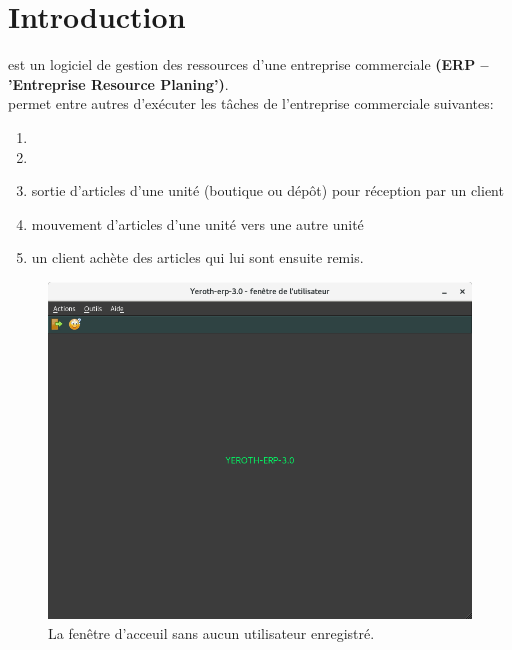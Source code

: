 \chapter{Introduction}\label{chap:introduction}

\yeren est un logiciel de gestion des ressources
d'une entreprise commerciale \textbf{(ERP -- 'Entreprise Resource
Planing')}.\\

\yeren permet entre autres d'ex\'ecuter les t\^aches de l'entreprise
commerciale suivantes:
\begin{enumerate}[1)]
	\item {}
	\item {}
	\item {} sortie d'articles
		d'une unit\'e (boutique ou d\'ep\^ot) pour r\'eception par un client
	\item {} mouvement d'articles
		d'une unit\'e vers une autre unit\'e
	\item {} un client ach\`ete
		des articles qui lui sont ensuite remis.\\
\end{enumerate} 


\begin{figure}[!htbp]
\centering
\includegraphics[scale=0.63]{images/yeren-fenetre-principale.png}
\caption{La fen\^etre d'acceuil sans aucun utilisateur enregistr\'e.}
\label{fig:fenetre-principale-utilisateur-non-enregistre}
\end{figure}


